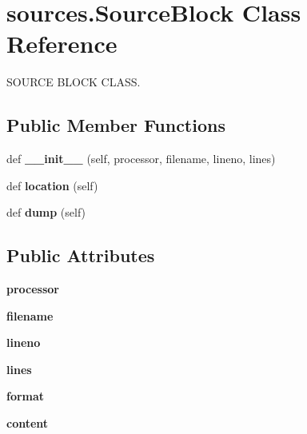 \hypertarget{classsources_1_1_source_block}{}\section{sources.\+Source\+Block Class Reference}
\label{classsources_1_1_source_block}


S\+O\+U\+R\+CE B\+L\+O\+CK C\+L\+A\+SS.  


\subsection*{Public Member Functions}
\begin{DoxyCompactItemize}
\item 
\mbox{\label{classsources_1_1_source_block_a2b9e38624d6465405176b7ddd22c85de}} 
def {\bfseries \+\_\+\+\_\+init\+\_\+\+\_\+} (self, processor, filename, lineno, lines)
\item 
\mbox{\label{classsources_1_1_source_block_a1e005be6a494646c29d44f36900b522c}} 
def {\bfseries location} (self)
\item 
\mbox{\label{classsources_1_1_source_block_a9e8e2023c9e5b856a60680678ee732e1}} 
def {\bfseries dump} (self)
\end{DoxyCompactItemize}
\subsection*{Public Attributes}
\begin{DoxyCompactItemize}
\item 
\mbox{\label{classsources_1_1_source_block_a8959c6541c8fe51ec6111dd80973805b}} 
{\bfseries processor}
\item 
\mbox{\label{classsources_1_1_source_block_a8c6429cc014b529c83008381c3628802}} 
{\bfseries filename}
\item 
\mbox{\label{classsources_1_1_source_block_ad5abe697abb489da39fcf1ada5cc0cc3}} 
{\bfseries lineno}
\item 
\mbox{\label{classsources_1_1_source_block_aebcb48dd1532e4dbe6ef18ff839dd1e6}} 
{\bfseries lines}
\item 
\mbox{\label{classsources_1_1_source_block_a841a9b75f5efd9649d0e86c1072ed65d}} 
{\bfseries format}
\item 
\mbox{\label{classsources_1_1_source_block_a3f9e3b90ee957c6d8fc8f326d05c7e3b}} 
{\bfseries content}
\end{DoxyCompactItemize}


